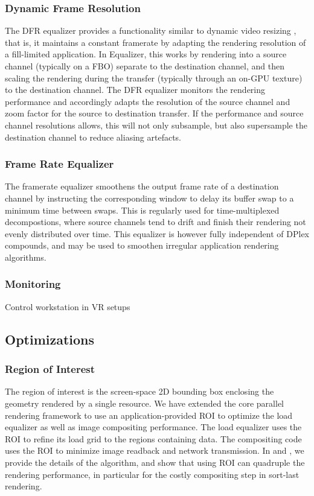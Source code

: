 \documentclass[10pt,journal,compsoc]{IEEEtran}
\begin{document}
\subsubsection{Dynamic Frame Resolution}

The DFR equalizer provides a functionality similar to dynamic video resizing
\cite{MBDM:97}, that is, it maintains a constant framerate by adapting the
rendering resolution of a fill-limited application. In Equalizer, this works by
rendering into a source channel (typically on a FBO) separate to the destination
channel, and then scaling the rendering during the transfer (typically through
an on-GPU texture) to the destination channel. The DFR equalizer monitors the
rendering performance and accordingly adapts the resolution of the source
channel and zoom factor for the source to destination transfer. If the
performance and source channel resolutions allows, this will not only subsample,
but also supersample the destination channel to reduce aliasing artefacts.

\subsubsection{Frame Rate Equalizer}\label{SEC_framerateEq}

The framerate equalizer smoothens the output frame rate of a destination
channel by instructing the corresponding window to delay its buffer swap to a
minimum time between swaps. This is regularly used for time-multiplexed
decompostions, where source channels tend to drift and finish their rendering
not evenly distributed over time. This equalizer is however fully independent of
DPlex compounds, and may be used to smoothen irregular application rendering
algorithms.

\subsubsection{Monitoring}

Control workstation in VR setups

\subsection{Optimizations}

\subsubsection{Region of Interest}

The region of interest is the screen-space 2D bounding box enclosing the
geometry rendered by a single resource. We have extended the core parallel
rendering framework to use an application-provided ROI to optimize the load
equalizer as well as image compositing performance. The load equalizer uses the
ROI to refine its load grid to the regions containing data. The compositing code
uses the ROI to minimize image readback and network transmission. In
\cite{MEP:10} and \cite{EBAHMP:12}, we provide the details of the algorithm, and
show that using ROI can quadruple the rendering performance, in particular for
the costly compositing step in sort-last rendering.
\end{document}
